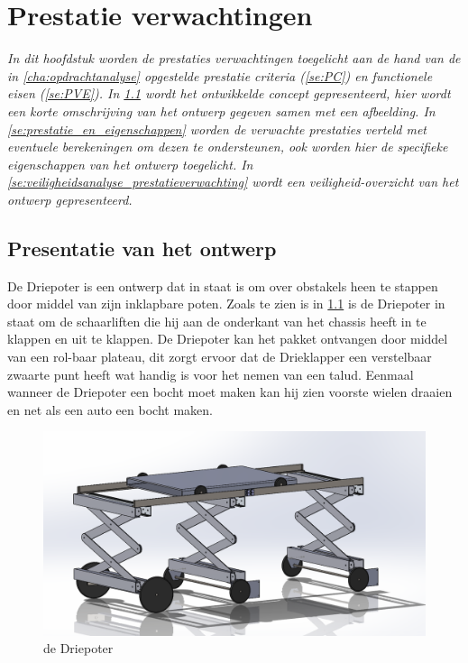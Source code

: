 
\chapter{Prestatie verwachtingen}
\label{Prestatie_verwachtingen}
\textit{In dit hoofdstuk worden de prestaties verwachtingen toegelicht aan de hand van de in \cref{cha:opdrachtanalyse} opgestelde prestatie criteria (\cref{se:PC}) en functionele eisen (\cref{se:PVE}). In \cref{se:presentatie_ontwerp} wordt het ontwikkelde concept gepresenteerd, hier wordt een korte omschrijving van het ontwerp gegeven samen met een afbeelding. In \cref{se:prestatie_en_eigenschappen} worden de verwachte prestaties verteld met eventuele berekeningen om dezen te ondersteunen, ook worden hier de specifieke eigenschappen van het ontwerp toegelicht. In \cref{se:veiligheidsanalyse_prestatieverwachting} wordt een veiligheid-overzicht van het ontwerp gepresenteerd.}

\section{Presentatie van het ontwerp}
\label{se:presentatie_ontwerp}

De Driepoter is een ontwerp dat in staat is om over obstakels heen te stappen door middel van zijn inklapbare poten. Zoals te zien is in \cref{fig:De_driepoter_Prestatie_analyse} is de Driepoter in staat om de schaarliften die hij aan de onderkant van het chassis heeft in te klappen en uit te klappen. De Driepoter kan het pakket ontvangen door middel van een rol-baar plateau, dit zorgt ervoor dat de Drieklapper een verstelbaar zwaarte punt heeft wat handig is voor het nemen van een talud. Eenmaal wanneer de Driepoter een bocht moet maken kan hij zien voorste wielen draaien en net als een auto een bocht maken.\\

\vspace{\baselineskip}
\begin{figure}[H]
    \includegraphics[width = 120mm]{04_gekozenconcept/eindconcept.png}
    \caption{de Driepoter}
    \label{fig:De_driepoter_Prestatie_analyse}
\end{figure}


